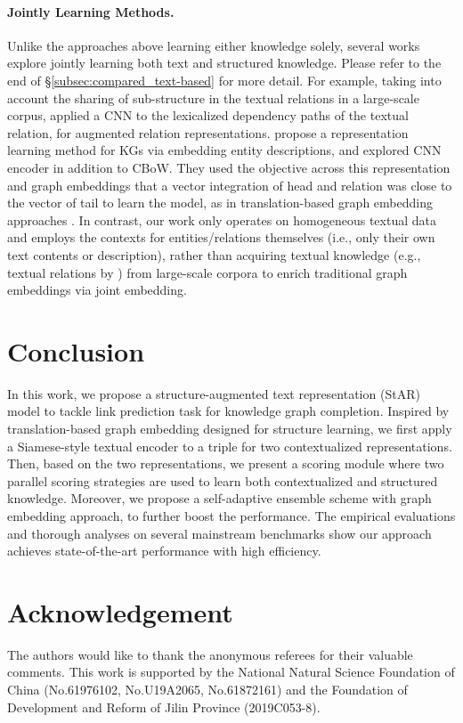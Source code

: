 \documentclass[sigconf]{acmart}
\begin{document}
\paragraph{Jointly Learning Methods.}
Unlike the approaches above learning either knowledge solely, several works explore jointly learning both text and structured knowledge. 
Please refer to the end of \S \ref{subsec:compared_text-based} for more detail. 
For example, taking into account the sharing of sub-structure in the textual relations in a large-scale corpus, \citet{FB15k-237} applied a CNN to the lexicalized dependency paths of the textual relation, for augmented relation representations. 
\citet{xie2016representation} propose a representation learning method for KGs via embedding entity descriptions, and explored CNN encoder in addition to CBoW. They used the objective across this representation and graph embeddings that a vector integration of head and relation was close to the vector of tail to learn the model, as in translation-based graph embedding approaches \cite{TransE}. 
In contrast, our work only operates on homogeneous textual data and employs the contexts for entities/relations themselves (i.e., only their own text contents or description), rather than acquiring textual knowledge (e.g., textual relations by \citet{FB15k-237}) from large-scale corpora to enrich traditional graph embeddings via joint embedding. 



\section{Conclusion} \label{sec:conclusion}
In this work, we propose a structure-augmented text representation (StAR) model to tackle link prediction task for knowledge graph completion. 
Inspired by translation-based graph embedding designed for structure learning, we first apply a Siamese-style textual encoder to a triple for two contextualized representations. 
Then, based on the two representations, we present a scoring module where two parallel scoring strategies are used to learn both contextualized and structured knowledge. 
Moreover, we propose a self-adaptive ensemble scheme with graph embedding approach, to further boost the performance. 
The empirical evaluations and thorough analyses on several mainstream benchmarks show our approach achieves state-of-the-art performance with high efficiency. 

\section*{Acknowledgement}
The authors would like to thank the anonymous referees for their valuable comments. This work is supported by the National Natural Science Foundation of China (No.61976102, No.U19A2065, No.61872161) and the Foundation of Development and Reform of Jilin Province (2019C053-8).
\end{document}
